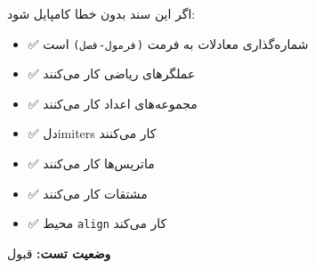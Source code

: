 \documentclass{matinbook}
\begin{document}
اگر این سند بدون خطا کامپایل شود:

\begin{itemize}
    \item ✅ شماره‌گذاری معادلات به فرمت \texttt{(فرمول-فصل)} است
    \item ✅ عملگرهای ریاضی کار می‌کنند
    \item ✅ مجموعه‌های اعداد کار می‌کنند
    \item ✅ دلimiters کار می‌کنند
    \item ✅ ماتریس‌ها کار می‌کنند
    \item ✅ مشتقات کار می‌کنند
    \item ✅ محیط \texttt{align} کار می‌کند
\end{itemize}

\textbf{وضعیت تست:} قبول
\end{document}
